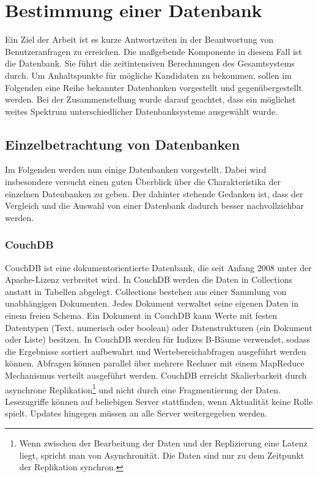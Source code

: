 \chapter{Bestimmung einer Datenbank}
\label{ch:AnalyseDatenbanken}

Ein Ziel der Arbeit ist es kurze Antwortzeiten in der Beantwortung von Benutzeranfragen zu erreichen. Die maßgebende Komponente in diesem Fall ist die Datenbank. Sie führt die zeitintensiven Berechnungen des Gesamtsystems durch. Um Anhaltspunkte für mögliche Kandidaten zu bekommen, sollen im Folgenden eine Reihe bekannter Datenbanken vorgestellt und gegenübergestellt werden. Bei der Zusammenstellung wurde darauf geachtet, dass ein möglichst weites Spektrum unterschiedlicher Datenbanksysteme ausgewählt wurde.

\section{Einzelbetrachtung von Datenbanken}
\label{ch:AnalyseDatenbanken:sec:Datenbanken}

Im Folgenden werden nun einige Datenbanken vorgestellt. Dabei wird insbesondere versucht einen guten Überblick über die Charakteristika der einzelnen Datenbanken zu geben. Der dahinter stehende Gedanken ist, dass der Vergleich und die Auswahl von einer Datenbank dadurch besser nachvollziehbar werden. 

\subsection{CouchDB}
\label{ch:AnalyseDatenbanken:sec:Datenbanken:subsec:CouchDB}

CouchDB \cite{couch2013} ist eine dokumentorientierte Datenbank, die seit Anfang 2008 unter der  Apache-Lizenz verbreitet wird. In CouchDB werden die Daten in Collections anstatt in Tabellen abgelegt. Collections bestehen aus einer Sammlung von unabhängigen Dokumenten. Jedes Dokument verwaltet seine eigenen Daten in einem freien Schema. 
Ein Dokument in CouchDB kann Werte mit festen Datentypen (Text, numerisch oder boolean) oder Datenstrukturen (ein Dokument oder Liste) besitzen. In CouchDB werden für Indizes B-Bäume verwendet, sodass die Ergebnisse sortiert aufbewahrt und Wertebereichabfragen ausgeführt werden können. Abfragen können parallel über mehrere Rechner mit einem MapReduce Mechanismus verteilt ausgeführt werden. CouchDB erreicht Skalierbarkeit durch asynchrone Replikation\footnote{Wenn zwischen der Bearbeitung der Daten und der Replizierung eine Latenz liegt, spricht man von Asynchronität. Die Daten sind nur zu dem Zeitpunkt der Replikation synchron.} und nicht durch eine  Fragmentierung der Daten. Lesezugriffe können auf beliebigen Server stattfinden, wenn Aktualität keine Rolle spielt. Updates hingegen müssen an alle Server weitergegeben werden.

